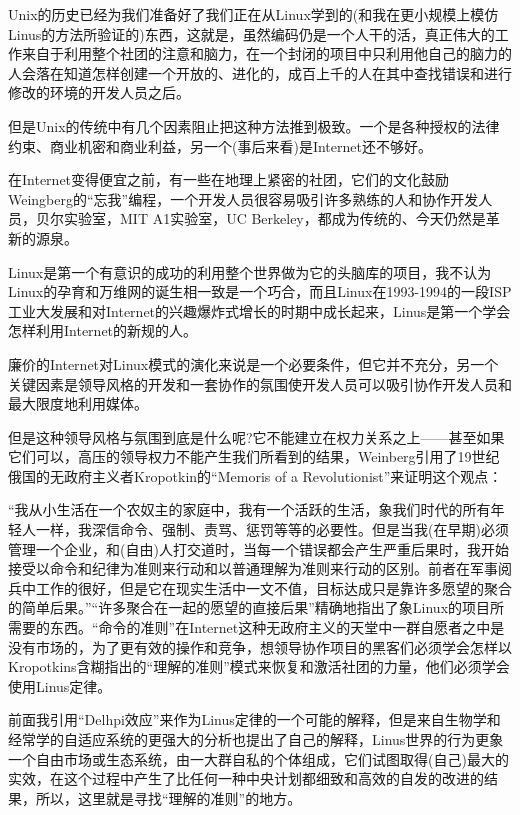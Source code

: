 \documentclass[a4paper,12pt,UTF8,twoside]{ctexbook}
\begin{document}
Unix的历史已经为我们准备好了我们正在从Linux学到的(和我在更小规模上模仿Linus的方法所验证的)东西，这就是，虽然编码仍是一个人干的活，真正伟大的工作来自于利用整个社团的注意和脑力，在一个封闭的项目中只利用他自己的脑力的人会落在知道怎样创建一个开放的、进化的，成百上千的人在其中查找错误和进行修改的环境的开发人员之后。


但是Unix的传统中有几个因素阻止把这种方法推到极致。一个是各种授权的法律约束、商业机密和商业利益，另一个(事后来看)是Internet还不够好。


在Internet变得便宜之前，有一些在地理上紧密的社团，它们的文化鼓励Weingberg的“忘我”编程，一个开发人员很容易吸引许多熟练的人和协作开发人员，贝尔实验室，MIT A1实验室，UC Berkeley，都成为传统的、今天仍然是革新的源泉。


Linux是第一个有意识的成功的利用整个世界做为它的头脑库的项目，我不认为Linux的孕育和万维网的诞生相一致是一个巧合，而且Linux在1993-1994的一段ISP工业大发展和对Internet的兴趣爆炸式增长的时期中成长起来，Linus是第一个学会怎样利用Internet的新规的人。


廉价的Internet对Linux模式的演化来说是一个必要条件，但它并不充分，另一个关键因素是领导风格的开发和一套协作的氛围使开发人员可以吸引协作开发人员和最大限度地利用媒体。


但是这种领导风格与氛围到底是什么呢?它不能建立在权力关系之上——甚至如果它们可以，高压的领导权力不能产生我们所看到的结果，Weinberg引用了19世纪俄国的无政府主义者Kropotkin的“Memoris of a Revolutionist”来证明这个观点：


“我从小生活在一个农奴主的家庭中，我有一个活跃的生活，象我们时代的所有年轻人一样，我深信命令、强制、责骂、惩罚等等的必要性。但是当我(在早期)必须管理一个企业，和(自由)人打交道时，当每一个错误都会产生严重后果时，我开始接受以命令和纪律为准则来行动和以普通理解为准则来行动的区别。前者在军事阅兵中工作的很好，但是它在现实生活中一文不值，目标达成只是靠许多愿望的聚合的简单后果。”“许多聚合在一起的愿望的直接后果”精确地指出了象Linux的项目所需要的东西。“命令的准则”在Internet这种无政府主义的天堂中一群自愿者之中是没有市场的，为了更有效的操作和竞争，想领导协作项目的黑客们必须学会怎样以Kropotkins含糊指出的“理解的准则”模式来恢复和激活社团的力量，他们必须学会使用Linus定律。


前面我引用“Delhpi效应”来作为Linus定律的一个可能的解释，但是来自生物学和经常学的自适应系统的更强大的分析也提出了自己的解释，Linus世界的行为更象一个自由市场或生态系统，由一大群自私的个体组成，它们试图取得(自己)最大的实效，在这个过程中产生了比任何一种中央计划都细致和高效的自发的改进的结果，所以，这里就是寻找“理解的准则”的地方。
\end{document}
